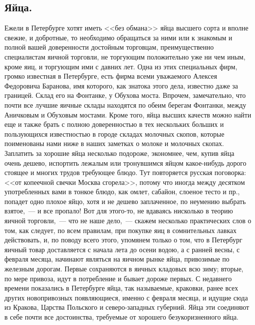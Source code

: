 \subsection{Яйца.}
Ежели в Петербурге хотят иметь <<без обмана>> яйца высшего сорта и вполне свежие, и добротные, то необходимо обращаться за ними или к знакомым и полной вашей доверенности достойным торговцам, преимущественно специалистам яичной торговли, не торгующим положительно уже ни чем иным, кроме яиц, и торгующим ими с давних лет. Одна из этих специальных фирм, громко известная в Петербурге, есть фирма всеми уважаемого Алексея Федоровича Баранова, имя которого, как знатока этого дела, известно даже за границей. Склад его на Фонтанке, у Обухова моста. Впрочем, замечательно, что почти все лучшие яичные склады находятся по обеим берегам Фонтанки, между Аничковым и Обуховым мостами. Кроме того, яйца высших качеств можно найти еще и также брать с полною доверенностью в тех нескольких больших и пользующихся известностью в городе складах молочных скопов, которые поименованы нами ниже в наших заметках о молоке и молочных скопах. Заплатить за хорошие яйца несколько подороже, экономнее, чем, купив яйца очень дешево, испортить лежалым или тронувшимся яйцом какое-нибудь дорого стоящее и многих трудов требующее блюдо. Тут повторяется русская поговорка: <<от копеечной свечки Москва сгорела>>, потому что иногда между десятком употребленных вами в тонкое блюдо, как омлет, сабайон, слоеное тесто и пр., попадет одно плохое яйцо, хотя и не дешево заплаченное, по неумению выбрать взятое,~--- и все пропало! Вот для этого-то, не вдаваясь нисколько в теорию яичной торговли,~--- что не наше дело,~--- скажем несколько практических слов о том, как следует, по всем правилам, при покупке яиц в сомнительных лавках действовать, и, по поводу всего этого, упомянем только о том, что в Петербург яичный товар доставляется с начала лета до осени водою, а с ранней весны, с февраля месяца, начинают являться на яичном рынке яйца, привозимые по железным дорогам. Первые сохраняются в яичных кладовых всю зиму; вторые, по мере привоза, идут в потребление и бывает дороже первых. С недавнего времени показались в Петербурге яйца, так называемые, краковки, ранее всех других новопривозных появляющиеся, именно с февраля месяца, и идущие сюда из Кракова, Царства Польского и северо-западных губерний. Яйца эти соединяют в себе почти все достоинства, требуемые от хорошего безукоризненного яйца.

